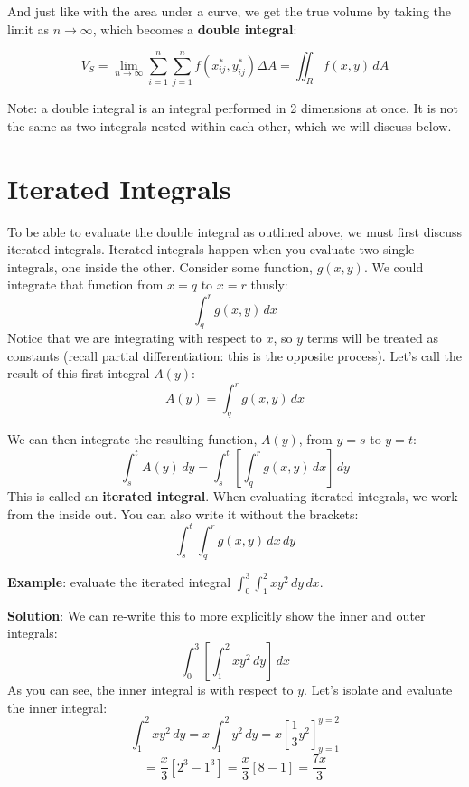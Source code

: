 And just like with the area under a curve, we get the true volume by taking the
limit as $n \to \infty$, which becomes a \textbf{double integral}:

\begin{mdframed}[style = important, frametitle = {Volume of a Solid over a 
Region}]
$$V_{\textit{S}} = \lim_{n \to \infty} \sum_{i = 1}^n \sum_{j = 1}^n f(x_{ij}^*
, y_{ij}^*) \Delta A = \iint_{\textit{R}} f(x, y)\,dA$$
\end{mdframed}

Note: a double integral is an integral performed in 2 dimensions at once. It is
not the same as two integrals nested within each other, which we will discuss 
below. 

\section{Iterated Integrals}

To be able to evaluate the double integral as outlined above, we must first 
discuss iterated integrals. Iterated integrals happen when you evaluate two 
single integrals, one inside the other. Consider some function, $g(x, y)$. We 
could integrate that function from $x = q$ to $x = r$ thusly:
$$\int_q^r g(x, y)\,dx$$
Notice that we are integrating with respect to $x$, so $y$ terms will be 
treated as constants (recall partial differentiation: this is the opposite 
process). Let's call the result of this first integral $A(y)$:
$$A(y) = \int_q^r g(x, y)\,dx$$

We can then integrate the resulting function, $A(y)$, from $y = s$ to $y = t$:
$$\int_s^t A(y)\,dy = \int_s^t \left[ \int_q^r g(x, y)\,dx \right]\,dy$$
This is called an \textbf{iterated integral}. When 
evaluating iterated integrals, we work from the inside out. You can also write 
it without the brackets:
$$\int_s^t \int_q^r g(x, y)\,dx\,dy$$

\textbf{Example}: evaluate the iterated integral $\int_0^3 \int_1^2 x y^2\,dy
\,dx$.

\textbf{Solution}: We can re-write this to more explicitly show the inner and 
outer integrals:
$$\int_0^3 \left[ \int_1^2 x y^2\,dy \right]\,dx$$
As you can see, the inner integral is with respect to $y$. Let's isolate and 
evaluate the inner integral:
$$\int_1^2 x y^2\,dy = x \int_1^2 y^2\,dy = x \left[ \frac{1}{3}y^2 \right]_{y 
= 1}^{y = 2}$$
$$= \frac{x}{3} \left[ 2^3 - 1^3 \right] = \frac{x}{3} \left[ 8 - 1 \right] = 
\frac{7x}{3}$$

